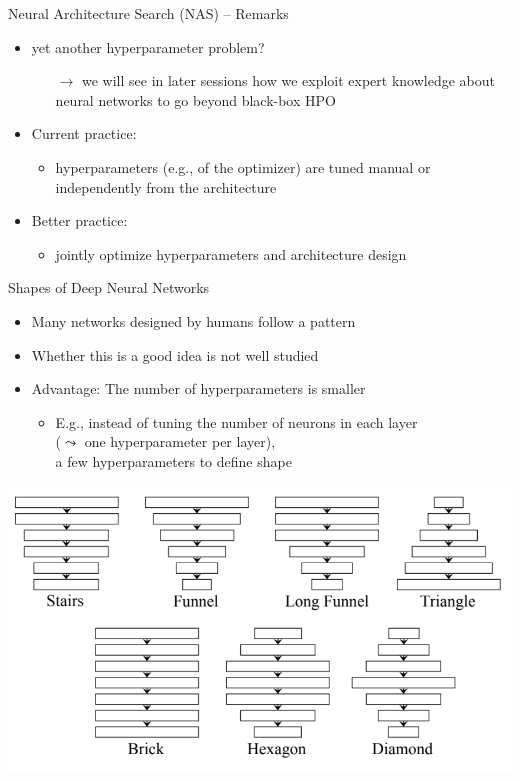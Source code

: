 \begin{frame}[c]{Neural Architecture Search (NAS) -- Remarks}

\begin{itemize}
  \item yet another hyperparameter problem?
  \begin{itemize}
    \item[$\to$] we will see in later sessions how we exploit expert knowledge about neural networks to go beyond black-box HPO
  \end{itemize}
  \pause
  \bigskip
  \item Current practice: 
  \begin{itemize}
    \item hyperparameters (e.g., of the optimizer) are tuned manual or independently from the architecture
  \end{itemize}
  \pause
  \item Better practice:
  \begin{itemize}
    \item jointly optimize hyperparameters and architecture design\\ 
  \end{itemize}
\end{itemize}

\end{frame}
\begin{frame}[c]{Shapes of Deep Neural Networks }

\begin{itemize}
  \item Many networks designed by humans follow a pattern
  \item Whether this is a good idea is not well studied
  \item Advantage: The number of hyperparameters is smaller
  \begin{itemize}
    \item E.g., instead of tuning the number of neurons in each layer\\ ($\leadsto$ one hyperparameter per layer),\\
          a few hyperparameters to define shape
  \end{itemize} 
\end{itemize}

\medskip
\centering
\includegraphics[width=.6\textwidth]{images/nas_shapes.png}

\end{frame}
